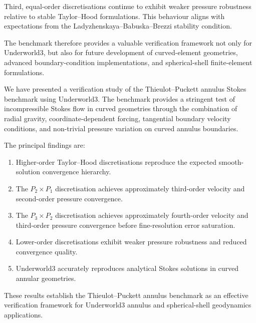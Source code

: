 \documentclass[gmd, manuscript]{copernicus}
\begin{document}
Third, equal-order discretisations continue to exhibit weaker pressure robustness relative to stable Taylor--Hood formulations.
This behaviour aligns with expectations from the Ladyzhenskaya--Babuska--Brezzi stability condition.

The benchmark therefore provides a valuable verification framework not only for Underworld3, but also for future development of curved-element geometries, advanced boundary-condition implementations, and spherical-shell finite-element formulations.

\conclusions

We have presented a verification study of the Thieulot--Puckett annulus Stokes benchmark using Underworld3.
The benchmark provides a stringent test of incompressible Stokes flow in curved geometries through the combination of radial gravity, coordinate-dependent forcing, tangential boundary velocity conditions, and non-trivial pressure variation on curved annulus boundaries.

The principal findings are:
\begin{enumerate}
  \item Higher-order Taylor--Hood discretisations reproduce the expected smooth-solution convergence hierarchy.
  \item The \(P_2\times P_1\) discretisation achieves approximately third-order velocity and second-order pressure convergence.
  \item The \(P_3\times P_2\) discretisation achieves approximately fourth-order velocity and third-order pressure convergence before fine-resolution error saturation.
  \item Lower-order discretisations exhibit weaker pressure robustness and reduced convergence quality.
  \item Underworld3 accurately reproduces analytical Stokes solutions in curved annular geometries.
\end{enumerate}

These results establish the Thieulot--Puckett annulus benchmark as an effective verification framework for Underworld3 annulus and spherical-shell geodynamics applications.



\end{document}
